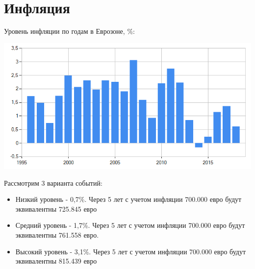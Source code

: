 \newpage

\section{Инфляция}

Уровень инфляции по годам в Еврозоне, \%:

\includegraphics[width=16cm]{pics/alina/inflation.png}

Рассмотрим 3 варианта событий:

\begin{itemize}
	\item Низкий уровень - 0,7\%. Через 5 лет с учетом инфляции 700.000 евро будут эквивалентны 725.845 евро
	\item Средний уровень - 1,7\%. Через 5 лет с учетом инфляции 700.000 евро будут эквивалентны 761.558 евро.
	\item Высокий уровень - 3,1\%. Через 5 лет с учетом инфляции 700.000 евро будут эквивалентны 815.439 евро
\end{itemize}